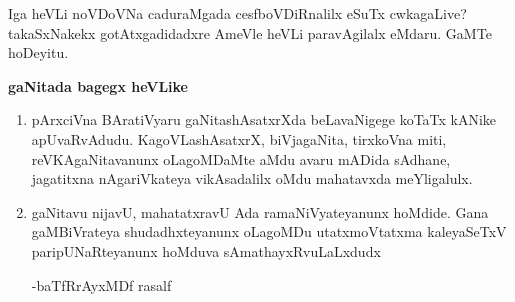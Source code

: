 Iga heVLi noVDoVNa caduraMgada cesfboVDiRnalilx eSuTx cwkagaLive? takaSxNakekx gotAtxgadidadxre AmeVle heVLi paravAgilalx eMdaru. GaMTe hoDeyitu.

\begin{center}
{\bf gaNitada bagegx heVLike}
\end{center}

\begin{enumerate}[\rm 1)]

\item pArxciVna BAratiVyaru gaNitashAsatxrXda beLavaNigege koTaTx kANike apUvaRvAdudu. KagoVLashAsatxrX, biVjagaNita, tirxkoVna miti, reVKAgaNitavanunx oLagoMDaMte aMdu avaru mADida sAdhane, jagatitxna nAgariVkateya vikAsadalilx oMdu mahatavxda meYligalulx.

\item gaNitavu nijavU, mahatatxravU Ada ramaNiVyateyanunx hoMdide. Gana gaMBiVrateya shudadhxteyanunx oLagoMDu utatxmoVtatxma kaleyaSeTxV paripUNaRte\-yanunx hoMduva sAmathayxRvuLaLxdudx 

\hfill{-baTfRrAyxMDf rasalf}

\end{enumerate}
